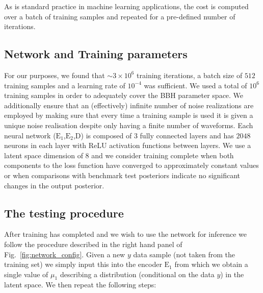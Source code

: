 \documentclass[%
showpacs,
 amsmath,amssymb,
 aps,
 twocolumn,
 prl,
 reprint,
floatfix,
]{revtex4-1}
\newcommand{\chris}[1]{\textbf{\textcolor{red}{CHRIS: #1}}}
\begin{document}
%
%
As is standard practice in machine learning applications, the cost
is computed over a batch of training samples and repeated for a pre-defined
number of iterations. 


\subsection{Network and Training parameters}
%
%
For our purposes, we found that $\sim3\times10^6$ training iterations, a batch
size of $512$ training samples and a learning rate of $10^{-4}$ was sufficient.
We used a total of $10^6$ training samples in order to adequately cover the
\ac{BBH} parameter space. We additionally ensure that an (effectively)
infinite number of noise realizations are employed by making sure that every
time a training sample is used it is given a unique noise realisation despite
only having a finite number of waveforms. Each neural network
($\text{E}_1$,$\text{E}_2$,D) is composed of 3 fully connected layers and has
$2048$ neurons in each layer with ReLU activation functions between layers. We
use a latent space dimension of $8$ and we consider training complete when
both components to the loss function have converged to approximately constant
values or when comparisons with benchmark test posteriors indicate no
significant changes in the output posterior.

\subsection{The testing procedure}
%
%
%
After training has completed and we wish to use the network for inference we
follow the procedure described in the right hand panel of
Fig.~\ref{fig:network_config}. Given a new $y$ data sample (not taken from the
training set) we simply input this into the encoder $\textrm{E}_1$ from which we
obtain a single value of $\mu_{1}$ describing a distribution (conditional on the
data $y$) in the latent space. We then repeat the following steps:
\end{document}
